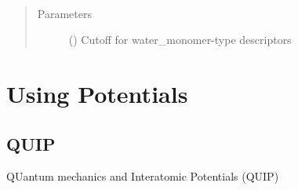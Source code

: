 \documentclass[letterpaper,10pt,english]{sphinxmanual}
\begin{document}
\begin{fulllineitems}
\label{\detokenize{descriptors:gap.descriptors.water_monomer}}~\begin{quote}\begin{description}
\item[{Parameters}] \leavevmode
{} () \textendash{} Cutoff for water\_monomer-type descriptors

\end{description}\end{quote}

\end{fulllineitems}



\section{Using Potentials}
\label{\detokenize{potentials:using-potentials}}\label{\detokenize{potentials::doc}}

\subsection{QUIP}
\label{\detokenize{potentials:quip}}
QUantum mechanics and Interatomic Potentials (QUIP)
\end{document}
